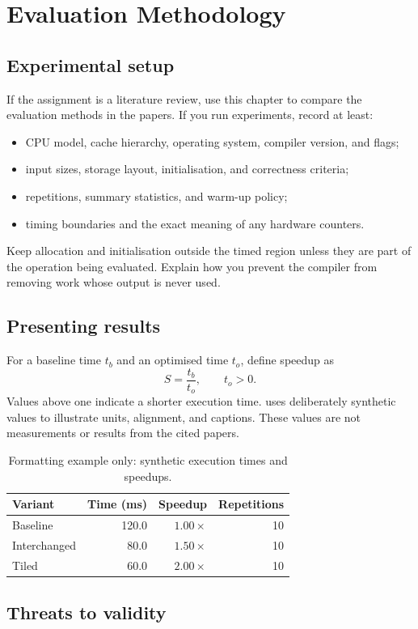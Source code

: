 \chapter{Evaluation Methodology}
\label{chap:evaluation}

\section{Experimental setup}
If the assignment is a literature review, use this chapter to compare the
evaluation methods in the papers. If you run experiments, record at least:
\begin{itemize}
  \item CPU model, cache hierarchy, operating system, compiler version, and flags;
  \item input sizes, storage layout, initialisation, and correctness criteria;
  \item repetitions, summary statistics, and warm-up policy;
  \item timing boundaries and the exact meaning of any hardware counters.
\end{itemize}
Keep allocation and initialisation outside the timed region unless they are
part of the operation being evaluated. Explain how you prevent the compiler
from removing work whose output is never used.

\section{Presenting results}
For a baseline time $t_b$ and an optimised time $t_o$, define speedup as
\begin{equation}
  S = \frac{t_b}{t_o}, \qquad t_o>0.
  \label{eq:speedup}
\end{equation}
Values above one indicate a shorter execution time. 
uses deliberately synthetic values to illustrate units, alignment, and captions.
These values are not measurements or results from the cited papers.

\begin{table}[htbp]
  \centering
  \caption{Formatting example only: synthetic execution times and speedups.}
  \label{tab:results}
  \begin{tabular}{lrrr}
    \toprule
    Variant & Time (ms) & Speedup & Repetitions \\
    \midrule
    Baseline & 120.0 & $1.00\times$ & 10 \\
    Interchanged & 80.0 & $1.50\times$ & 10 \\
    Tiled & 60.0 & $2.00\times$ & 10 \\
    \bottomrule
  \end{tabular}
\end{table}

\section{Threats to validity}
